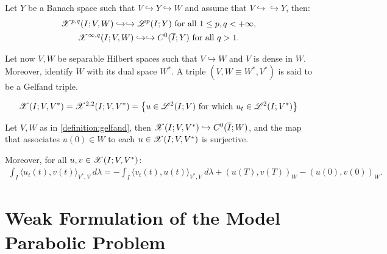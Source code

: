 \begin{theorem}
    Let $Y$ be a Banach space such that $V \hookrightarrow Y \hookrightarrow W$ and assume that $V \hookrightarrow \hookrightarrow Y$, then:
    \begin{gather}
        \mathscr{X}^{p, q}(I; V, W) \hookrightarrow \hookrightarrow \mathscr{L}^{p}(I; Y) \text{ for all } 1 \leq p, q < +\infty,\\
        \mathscr{X}^{\infty, q}(I; V, W) \hookrightarrow \hookrightarrow C^0(\overline{I}; Y) \text{ for all } q > 1.
    \end{gather}
\end{theorem}

\begin{definition} \label{definition:gelfand}
    Let now $V, W$ be separable Hilbert spaces such that $V \hookrightarrow W$ and $V$ is dense in $W$. Moreover, identify $W$ with its dual space $W^*$. A triple $\left( V, W \equiv W^*, V^* \right)$ is said to be a Gelfand triple.
\end{definition}

\begin{definition}[$\SpaceX(I; V, V^*)$] \label{definition:x}
    \begin{gather}
        \mathscr{X}(I; V, V^*) = \mathscr{X}^{2, 2}(I; V, V^*) = \left\{ u \in \mathscr{L}^{2}(I; V) \text{ for which } u_t \in \mathscr{L}^{2}(I; V^*) \right\}
    \end{gather}
\end{definition}

\begin{theorem}
    Let $V, W$ as in \ref{definition:gelfand}, then \newline \nobreak $\mathscr{X}(I; V, V^*) \hookrightarrow C^0(\overline{I};W)$, and the map that associates $u(0) \in W$ to each $u \in \mathscr{X}(I; V, V^*)$ is surjective.

    Moreover, for all $u, v \in \mathscr{X}(I; V, V^*)$:
    \begin{gather}
        \int_I \langle u_t(t), v(t) \rangle_{V^*, V} ~ d \lambda = - \int_I \langle v_t(t), u(t) \rangle_{V^*, V} ~ d \lambda + \left( u(T), v(T) \right)_W - \left( u(0), v(0) \right)_W.
    \end{gather}
\end{theorem}

\newpage
\section{Weak Formulation of the Model Parabolic Problem}

